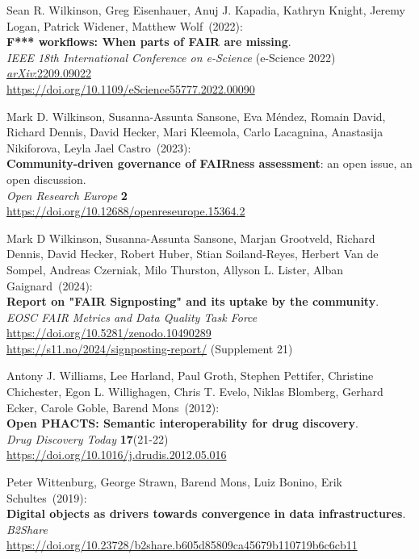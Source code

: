 \begin{thebibliography}{9}
Sean R. Wilkinson, Greg Eisenhauer, Anuj J. Kapadia, Kathryn Knight, Jeremy Logan, Patrick Widener, Matthew Wolf~(2022): \\
\textbf{F*** workflows: When parts of {FAIR} are missing}. \\
\emph{IEEE 18th International Conference on e-Science} (e-Science 2022) \\
\href{https://doi.org/10.48550/arXiv.2209.09022}{\emph{arXiv}:2209.09022} \\
\url{https://doi.org/10.1109/eScience55777.2022.00090}

Mark D. Wilkinson, Susanna-Assunta Sansone, Eva Méndez, Romain David, Richard Dennis, David Hecker, Mari Kleemola, Carlo Lacagnina, Anastasija Nikiforova, Leyla Jael Castro~(2023): \\
\textbf{Community-driven governance of FAIRness assessment}: an open issue, an open discussion.\\
\emph{Open Research Europe} \textbf{2}\\
\url{https://doi.org/10.12688/openreseurope.15364.2}

Mark D Wilkinson, Susanna-Assunta Sansone, Marjan Grootveld, Richard Dennis, David Hecker, Robert Huber, Stian Soiland-Reyes, Herbert Van de Sompel, Andreas Czerniak, Milo Thurston, Allyson L. Lister, Alban Gaignard~(2024):\\  
\textbf{Report on "FAIR Signposting" and its uptake by the community}.\\
\emph{EOSC FAIR Metrics and Data Quality Task Force} \\
\url{https://doi.org/10.5281/zenodo.10490289} \\
\url{https://s11.no/2024/signposting-report/} (Supplement 21)

Antony J. Williams, Lee Harland, Paul Groth, Stephen Pettifer, Christine Chichester, Egon L. Willighagen, Chris T. Evelo, Niklas Blomberg, Gerhard Ecker, Carole Goble, Barend Mons~(2012): \\
\textbf{Open {PHACTS}: Semantic interoperability for drug discovery}.\\
\emph{Drug Discovery Today} \textbf{17}(21-22) \\
\url{https://doi.org/10.1016/j.drudis.2012.05.016}

Peter Wittenburg, George Strawn, Barend Mons, Luiz Bonino, Erik Schultes~(2019): \\
\textbf{Digital objects as drivers towards convergence in data infrastructures}. \\
\emph{B2Share}\\
\url{https://doi.org/10.23728/b2share.b605d85809ca45679b110719b6c6cb11}


\end{thebibliography}

